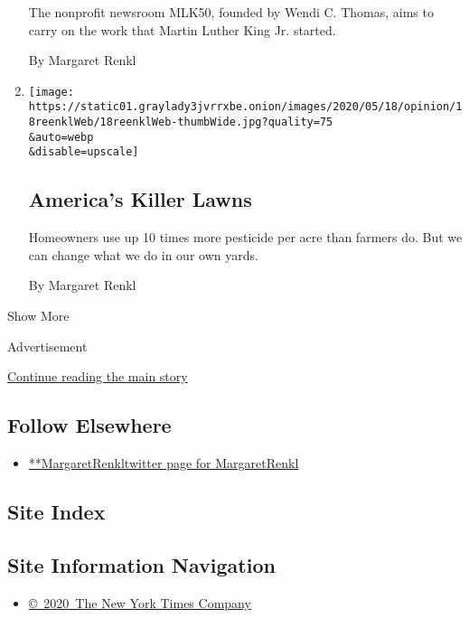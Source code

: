 \begin{enumerate}
  The nonprofit newsroom MLK50, founded by Wendi C. Thomas, aims to
  carry on the work that Martin Luther King Jr. started.

  By Margaret Renkl
\item
  \href{/2020/05/18/opinion/lawn-pesticides-insect-extinction.html}{}

  \texttt{[image: https://static01.graylady3jvrrxbe.onion/images/2020/05/18/opinion/18reenklWeb/18reenklWeb-thumbWide.jpg?quality=75\\\&auto=webp\\\&disable=upscale]}

  \hypertarget{americas-killer-lawns}{%
  \subsection{America's Killer Lawns}\label{americas-killer-lawns}}

  Homeowners use up 10 times more pesticide per acre than farmers do.
  But we can change what we do in our own yards.

  By Margaret Renkl
\end{enumerate}

Show More

Advertisement

\protect\hyperlink{after-mid2}{Continue reading the main story}

\hypertarget{follow-elsewhere}{%
\subsection{Follow Elsewhere}\label{follow-elsewhere}}

\begin{itemize}
\tightlist
\item
  \href{https://twitter.com/MargaretRenkl}{**MargaretRenkltwitter page
  for MargaretRenkl}
\end{itemize}

\hypertarget{site-index}{%
\subsection{Site Index}\label{site-index}}

\hypertarget{site-information-navigation}{%
\subsection{Site Information
Navigation}\label{site-information-navigation}}

\begin{itemize}
\tightlist
\item
  \href{https://help.nytimes3xbfgragh.onion/hc/en-us/articles/115014792127-Copyright-notice}{©~2020~The
  New York Times Company}
\end{itemize}

